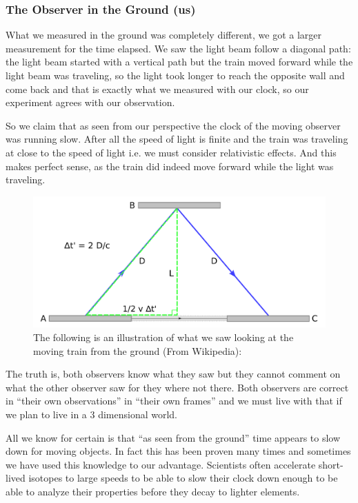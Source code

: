 \documentclass[12pt, letterpaper]{article}
\begin{document}
    \subsubsection*{The Observer in the Ground (us)}
    What we measured in the ground was completely different, 
    we got a larger measurement for the time elapsed. 
    We saw the light beam follow a diagonal path: the light beam started with a 
    vertical path but the train moved forward while the light beam was 
    traveling, so the light took longer to reach the opposite wall and come 
    back and that is exactly what we measured with our clock, so our experiment 
    agrees with our observation. 
    
    So we claim that as seen from our perspective the clock of the moving 
    observer was running slow. 
    After all the speed of light is finite and the train was traveling 
    at close to the speed of light i.e. we must consider relativistic 
    effects. And this makes perfect sense, as the train did indeed move 
    forward while the light was traveling.
    
    \begin{figure}[h!]
        \caption{The following is an illustration of what we saw looking 
        at the moving train from the ground (From Wikipedia):}
        \centering
        \includegraphics[scale=0.49]{time_dilation_ground.pdf}
    \end{figure}
    
    \medskip
    The truth is, both observers know what they saw but they cannot comment on 
    what the other observer saw for they where not there. Both observers are 
    correct in ``their own observations'' in ``their own frames'' and we must 
    live with that if we plan to live in a 3 dimensional world.          
    
    All we know for certain is that ``as seen from the ground'' time appears to     
    slow down for moving objects. In fact this has been proven many times 
    and sometimes we have used this knowledge to our advantage. 
    Scientists often accelerate short-lived isotopes to large speeds to be 
    able to slow their clock down enough to be able to analyze their properties 
    before they decay to lighter elements.        
    
\end{document}
